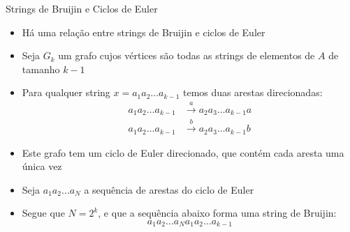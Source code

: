 \begin{frame}[fragile]{Strings de Bruijin e Ciclos de Euler}

    \begin{itemize}
        \item Há uma relação entre strings de Bruijin e ciclos de Euler

        \item Seja $G_k$ um grafo cujos vértices são todas as strings de elementos de $A$ de 
            tamanho $k - 1$

        \item Para qualquer string $x = a_1a_2\ldots a_{k-1}$ temos duas arestas direcionadas:
            \begin{align*}
                a_1a_2\ldots a_{k-1} &\xrightarrow{\ a\ } a_2a_3\ldots a_{k-1}a \\
                a_1a_2\ldots a_{k-1} &\xrightarrow{\ b\ } a_2a_3\ldots a_{k-1}b
            \end{align*}

        \item Este grafo tem um ciclo de Euler direcionado, que contém cada aresta uma única vez

        \item Seja $a_1a_2\ldots a_N$ a sequência de arestas do ciclo de Euler

        \item Segue que $N = 2^k$, e que a sequência abaixo forma uma string de Bruijin:
        \[
            a_1a_2\ldots a_Na_1a_2\ldots a_{k-1}
        \]
 
   \end{itemize}

\end{frame}
